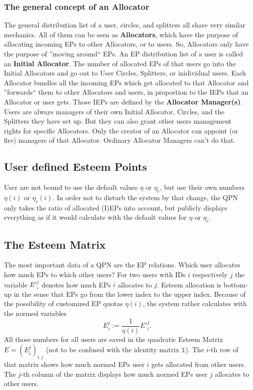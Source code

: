 \documentclass[a4paper,12pt]{scrartcl}
\begin{document}
\subsubsection{The general concept of an Allocator}
The general distribution list of a user, circles, and splitters all share very similar mechanics. All of them can be seen as \textbf{Allocators}, which have the purpose of allocating incoming EPs to other Allocators, or to users. So, Allocators only have the purpose of ''moving around`` EPs. An EP distribution list of a user is called an \textbf{Initial Allocator}. The number of allocated EPs of that users go into the Initial Allocators and go out to User Circles, Splitters, or inidividual users. Each Allocator bundles all the incoming EPs which get allocated to that Allocator and ''forwards`` them to other Allocators and users, in proportion to the IEPs that an Allocator or user gets. Those IEPs are defined by the \textbf{Allocator Manager(s)}. Users are always managers of their own Initial Allocator, Circles, and the Splitters they have set up. But they can also grant other users management rights for specific Allocators. Only the creator of an Allocator can appoint (or fire) managers of that Allocator. 
Ordinary Allocator Managers can't do that.

\subsection{User defined Esteem Points}
User are not bound to use the default values $\eta$ or $\eta_c$, but use their own numbers $\eta(i)$ or $\eta_c(i)$. In order not to disturb the system by that change, the QPN only takes the ratio of allocated (I)EPs into account, but publicly displays everything as if it would calculate with the default values for $\eta$ or $\eta_c$.

\subsection{The Esteem Matrix}
The most important data of a QPN are the EP relations. Which user allocates how much EPs to which other users? For two users with IDs $i$ respectively $j$ the variable $E'^j_i$ denotes how much EPs $i$ allocates to $j$. Esteem allocation is bottom-up in the sense that EPs go from the lower index to the upper index. Because of the possibility of customized EP quotas $\eta(i)$, the system rather calculates with the normed variables
$$E^j_i := \frac{1}{\eta(i)} E'^j_i.$$
All those numbers for all users are saved in the quadratic Esteem Matrix $E = (E^j_i)_{i,j}$ (not to be confused with the identity matrix $\mathds{1}$). The $i$-th row of that matrix shows how much normed EPs user $i$ gets allocated from other users. The $j$-th column of the matrix displays how much normed EPs user $j$ allocates to other users.
\end{document}
